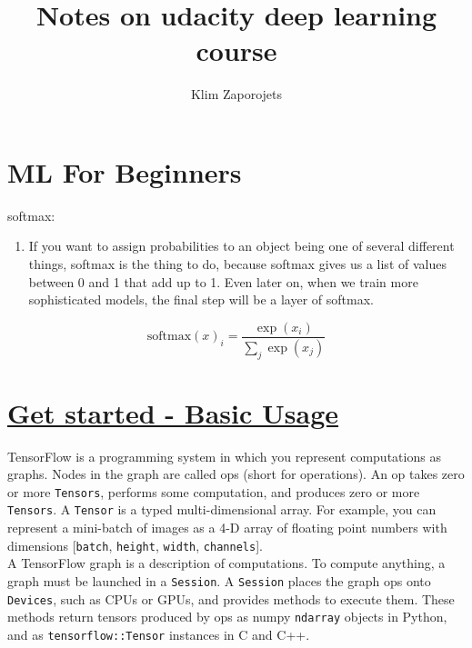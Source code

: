 \documentclass[11pt,a4paper]{article}
\author{Klim Zaporojets}
\title{Notes on udacity deep learning course}
\begin{document}
\section{ML For Beginners}
softmax:
\begin{enumerate}
	\item If you want to assign probabilities to an object being one of several different things, softmax is the thing to do, because softmax gives us a list of values between 0 and 1 that add up to 1. Even later on, when we train more sophisticated models, the final step will be a layer of softmax.
\end{enumerate}

$$\text{softmax}(x)_i = \dfrac{\exp(x_i)}{\sum_j{\exp(x_j)}}$$

\section{\href{www.tensorflow.org/versions/r0.11/get_started/basic_usage.html}{Get started - Basic Usage}}
TensorFlow is a programming system in which you represent computations as graphs. Nodes in the graph are called ops (short for operations). An op takes zero or more \texttt{Tensors}, performs some computation, and produces zero or more \texttt{Tensors}. A \texttt{Tensor} is a typed multi-dimensional array. For example, you can represent a mini-batch of images as a 4-D array of floating point numbers with dimensions [\texttt{batch}, \texttt{height}, \texttt{width}, \texttt{channels}].\\

A TensorFlow graph is a description of computations. To compute anything, a graph must be launched in a \texttt{Session}. A \texttt{Session} places the graph ops onto \texttt{Devices}, such as CPUs or GPUs, and provides methods to execute them. These methods return tensors produced by ops as numpy \texttt{ndarray} objects in Python, and as \texttt{tensorflow::Tensor} instances in C and C++. \\
\end{document}
